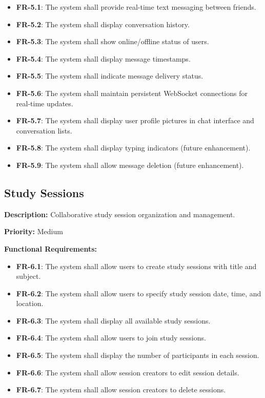 \documentclass[12pt,a4paper]{article}
\begin{document}
\begin{itemize}
    \item \textbf{FR-5.1}: The system shall provide real-time text messaging between friends.
    \item \textbf{FR-5.2}: The system shall display conversation history.
    \item \textbf{FR-5.3}: The system shall show online/offline status of users.
    \item \textbf{FR-5.4}: The system shall display message timestamps.
    \item \textbf{FR-5.5}: The system shall indicate message delivery status.
    \item \textbf{FR-5.6}: The system shall maintain persistent WebSocket connections for real-time updates.
    \item \textbf{FR-5.7}: The system shall display user profile pictures in chat interface and conversation lists.
    \item \textbf{FR-5.8}: The system shall display typing indicators (future enhancement).
    \item \textbf{FR-5.9}: The system shall allow message deletion (future enhancement).
\end{itemize}

\subsection{Study Sessions}
\textbf{Description:} Collaborative study session organization and management.

\textbf{Priority:} Medium

\textbf{Functional Requirements:}

\begin{itemize}
    \item \textbf{FR-6.1}: The system shall allow users to create study sessions with title and subject.
    \item \textbf{FR-6.2}: The system shall allow users to specify study session date, time, and location.
    \item \textbf{FR-6.3}: The system shall display all available study sessions.
    \item \textbf{FR-6.4}: The system shall allow users to join study sessions.
    \item \textbf{FR-6.5}: The system shall display the number of participants in each session.
    \item \textbf{FR-6.6}: The system shall allow session creators to edit session details.
    \item \textbf{FR-6.7}: The system shall allow session creators to delete sessions.
\end{itemize}
\end{document}
